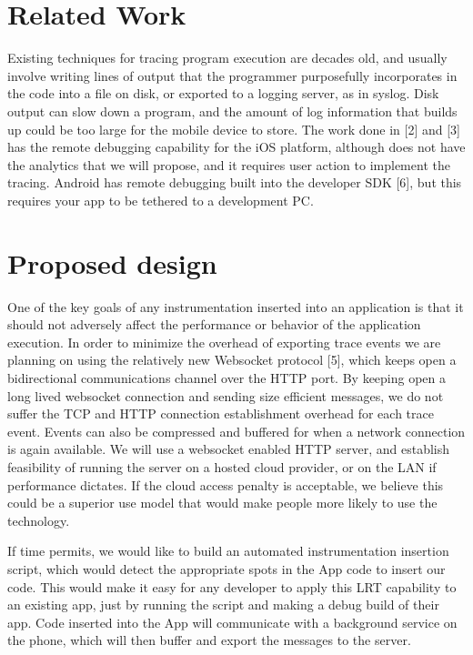 \documentclass[11pt]{article}
\begin{document}
\section{Related Work} 
Existing techniques for tracing program execution are decades old, and usually 
involve writing lines of output that the programmer purposefully incorporates 
in the code into a file on disk, or exported to a logging server, as in syslog. 
Disk output can slow down a program, and the amount of log information that 
builds up could be too large for the mobile device to store. The work done in 
[2] and [3] has the remote debugging capability for the iOS platform, although 
does not have the analytics that we will propose, and it requires user action 
to implement the tracing. Android has remote debugging built into the developer 
SDK [6], but this requires your app to be tethered to a development PC.

\section{Proposed design}
One of the key goals of any instrumentation inserted into an application is 
that it should not adversely affect the performance or behavior of the 
application execution. In order to minimize the overhead of exporting trace 
events we are planning on using the relatively new Websocket protocol [5], 
which keeps open a bidirectional communications channel over the HTTP port. 
By keeping open a long lived websocket connection and sending size efficient 
messages, we do not suffer the TCP and HTTP connection establishment overhead 
for each trace event. Events can also be compressed and buffered for when a 
network connection is again available.  We will use a websocket enabled HTTP 
server, and establish feasibility of running the server on a hosted cloud 
provider, or on the LAN if performance dictates. If the cloud access penalty is 
acceptable, we believe this could be a superior use model that would make people
more likely to use the technology.

If time permits, we would like to build an automated instrumentation insertion 
script, which would detect the appropriate spots in the App code to insert our 
code. This would make it easy for any developer to apply this  LRT capability to
an existing app, just by running the script and making a debug build of their 
app. Code inserted into the App will communicate with a background service on 
the phone, which will then buffer and export the messages to the server.
\end{document}

